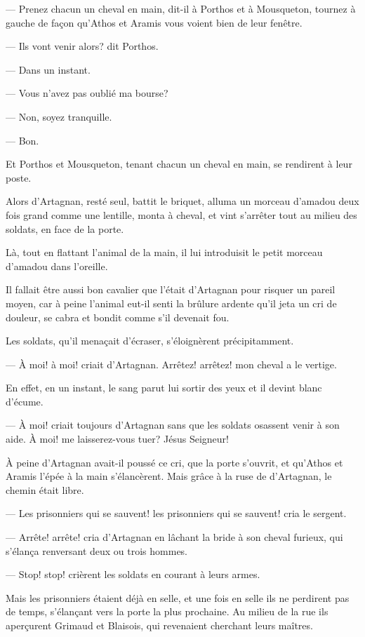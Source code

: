 — Prenez chacun un cheval en main, dit-il à Porthos et à Mousqueton, tournez à gauche de façon qu'Athos et Aramis vous voient bien de leur fenêtre.

— Ils vont venir alors? dit Porthos.

— Dans un instant.

— Vous n'avez pas oublié ma bourse?

— Non, soyez tranquille.

— Bon.

Et Porthos et Mousqueton, tenant chacun un cheval en main, se rendirent à leur poste.

Alors d'Artagnan, resté seul, battit le briquet, alluma un morceau d'amadou deux fois grand comme une lentille, monta à cheval, et vint s'arrêter tout au milieu des soldats, en face de la porte.

Là, tout en flattant l'animal de la main, il lui introduisit le petit morceau d'amadou dans l'oreille.

Il fallait être aussi bon cavalier que l'était d'Artagnan pour risquer un pareil moyen, car à peine l'animal eut-il senti la brûlure ardente qu'il jeta un cri de douleur, se cabra et bondit comme s'il devenait fou.

Les soldats, qu'il menaçait d'écraser, s'éloignèrent précipitamment.

— À moi! à moi! criait d'Artagnan. Arrêtez! arrêtez! mon cheval a le vertige.

En effet, en un instant, le sang parut lui sortir des yeux et il devint blanc d'écume.

— À moi! criait toujours d'Artagnan sans que les soldats osassent venir à son aide. À moi! me laisserez-vous tuer? Jésus Seigneur!

À peine d'Artagnan avait-il poussé ce cri, que la porte s'ouvrit, et qu'Athos et Aramis l'épée à la main s'élancèrent. Mais grâce à la ruse de d'Artagnan, le chemin était libre.

— Les prisonniers qui se sauvent! les prisonniers qui se sauvent! cria le sergent.

— Arrête! arrête! cria d'Artagnan en lâchant la bride à son cheval furieux, qui s'élança renversant deux ou trois hommes.

— Stop! stop! crièrent les soldats en courant à leurs armes.

Mais les prisonniers étaient déjà en selle, et une fois en selle ils ne perdirent pas de temps, s'élançant vers la porte la plus prochaine. Au milieu de la rue ils aperçurent Grimaud et Blaisois, qui revenaient cherchant leurs maîtres.

